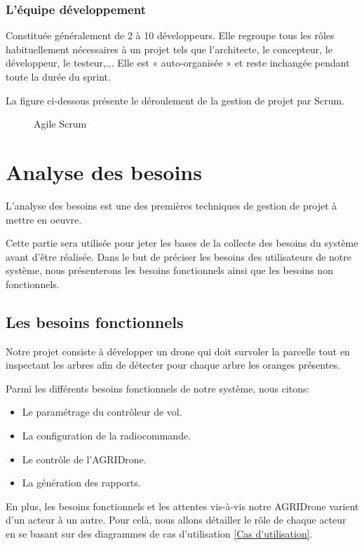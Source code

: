 \subsubsection{L'équipe développement  }
Constituée généralement de 2 à 10 développeurs. Elle regroupe tous les rôles habituellement nécessaires à un projet tels que l'architecte, le concepteur, le développeur, le testeur,... Elle est « auto-organisée » et reste inchangée pendant toute la durée du sprint.

La figure ci-dessous présente le déroulement de la gestion de projet par Scrum.

\begin{figure} [H]
	\begin{center}
		\centering
	\end{center}
	\caption{Agile Scrum}
\end{figure}
	\section{Analyse des besoins }	
	L'analyse des besoins est une des premières techniques de gestion de projet à mettre en oeuvre.
	
	Cette partie sera utilisée pour jeter les bases de la collecte des besoins du système avant d'être réalisée.
	Dans le but de préciser les besoins des utilisateurs de notre système, nous présenterons les besoins fonctionnels ainsi que les besoins non fonctionnels.
	
	\subsection{Les besoins fonctionnels}
	Notre projet consiste à développer un drone qui doit survoler la parcelle tout en inspectant les arbres afin de détecter pour chaque arbre les oranges présentes.
	
	Parmi les différents besoins fonctionnels de notre système, nous citons:
	\begin{itemize}
		\item Le paramétrage du contrôleur de vol. 
		\item  La configuration de la radiocommande. 
		\item Le contrôle de l'AGRIDrone.
		\item La génération des rapports. 
	\end{itemize} 
	
	En plus, les besoins fonctionnels et les attentes vis-à-vis notre AGRIDrone varient d'un acteur à un autre. Pour celà, nous allons détailler le rôle de chaque acteur en se basant sur des diagrammes de cas d'utilisation \ref{Cas d'utilisation}.
	
